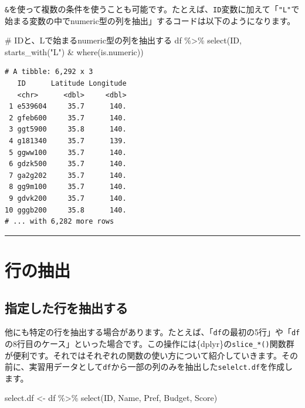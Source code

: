 \documentclass[
  a4paper,
  pandoc,
  ja=standard,
  jafont=haranoaji]{bxjsbook}
\newenvironment{Shaded}{\begin{snugshade}}{\end{snugshade}}
\newcommand{\CommentTok}[1]{\textcolor[rgb]{0.37,0.37,0.37}{#1}}
\newcommand{\FunctionTok}[1]{\textcolor[rgb]{0.28,0.35,0.67}{#1}}
\newcommand{\NormalTok}[1]{\textcolor[rgb]{0.00,0.48,0.65}{#1}}
\newcommand{\OtherTok}[1]{\textcolor[rgb]{0.00,0.48,0.65}{#1}}
\newcommand{\SpecialCharTok}[1]{\textcolor[rgb]{0.37,0.37,0.37}{#1}}
\newcommand{\StringTok}[1]{\textcolor[rgb]{0.13,0.47,0.30}{#1}}
\begin{document}
\texttt{\&}を使って複数の条件を使うことも可能です。たとえば、\texttt{ID}変数に加えて「\texttt{"L"}で始まる変数の中でnumeric型の列を抽出」するコードは以下のようになります。

\begin{Shaded}
\begin{Highlighting}[numbers=left,,]
\CommentTok{\# IDと、Lで始まるnumeric型の列を抽出する}
\NormalTok{df }\SpecialCharTok{\%\textgreater{}\%}
  \FunctionTok{select}\NormalTok{(ID, }\FunctionTok{starts\_with}\NormalTok{(}\StringTok{"L"}\NormalTok{) }\SpecialCharTok{\&} \FunctionTok{where}\NormalTok{(is.numeric))}
\end{Highlighting}
\end{Shaded}

\begin{verbatim}
# A tibble: 6,292 x 3
   ID      Latitude Longitude
   <chr>      <dbl>     <dbl>
 1 e539604     35.7      140.
 2 gfeb600     35.7      140.
 3 ggt5900     35.8      140.
 4 g181340     35.7      139.
 5 ggww100     35.7      140.
 6 gdzk500     35.7      140.
 7 ga2g202     35.7      140.
 8 gg9m100     35.7      140.
 9 gdvk200     35.7      140.
10 gggb200     35.8      140.
# ... with 6,282 more rows
\end{verbatim}

\begin{center}\rule{0.5\linewidth}{0.5pt}\end{center}

\hypertarget{sec-handling1_filter}{%
\section{行の抽出}\label{sec-handling1_filter}}

\hypertarget{ux6307ux5b9aux3057ux305fux884cux3092ux62bdux51faux3059ux308b}{%
\subsection{指定した行を抽出する}\label{ux6307ux5b9aux3057ux305fux884cux3092ux62bdux51faux3059ux308b}}

他にも特定の行を抽出する場合があります。たとえば、「\texttt{df}の最初の5行」や「\texttt{df}の8行目のケース」といった場合です。この操作には\{dplyr\}の\texttt{slice\_*()}関数群が便利です。それではそれぞれの関数の使い方について紹介していきます。その前に、実習用データとして\texttt{df}から一部の列のみを抽出した\texttt{selelct.df}を作成します。

\begin{Shaded}
\begin{Highlighting}[numbers=left,,]
\NormalTok{select.df }\OtherTok{\textless{}{-}}\NormalTok{ df }\SpecialCharTok{\%\textgreater{}\%} 
  \FunctionTok{select}\NormalTok{(ID, Name, Pref, Budget, Score)}
\end{Highlighting}
\end{Shaded}
\end{document}
